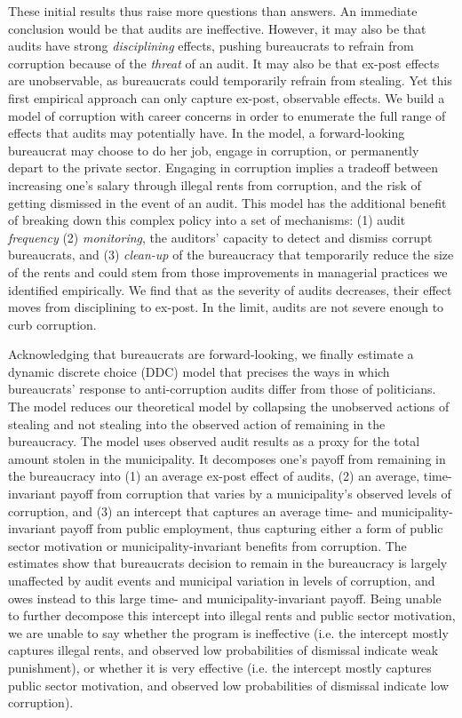 These initial results thus raise more questions than answers. An immediate conclusion would be that audits are ineffective. However, it may also be that audits have strong \emph{disciplining} effects, pushing bureaucrats to refrain from corruption because of the \emph{threat} of an audit. It may also be that ex-post effects are unobservable, as bureaucrats could temporarily refrain from stealing. Yet this first empirical approach can only capture ex-post, observable effects. We build a model of corruption with career concerns in order to enumerate the full range of effects that audits may potentially have. In the model, a forward-looking bureaucrat may choose to do her job, engage in corruption, or permanently depart to the private sector. Engaging in corruption implies a tradeoff between increasing one's salary through illegal rents from corruption, and the risk of getting dismissed in the event of an audit. This model has the additional benefit of breaking down this complex policy into a set of mechanisms: (1) audit \emph{frequency} (2) \emph{monitoring}, the auditors' capacity to detect and dismiss corrupt bureaucrats, and (3) \emph{clean-up} of the bureaucracy that temporarily reduce the size of the rents and could stem from those improvements in managerial practices we identified empirically. We find that as the severity of audits decreases, their effect moves from disciplining to ex-post. In the limit, audits are not severe enough to curb corruption.

Acknowledging that bureaucrats are forward-looking, we finally estimate a dynamic discrete choice (DDC) model that precises the ways in which bureaucrats' response to anti-corruption audits differ from those of politicians. The model reduces our theoretical model by collapsing the unobserved actions of stealing and not stealing into the observed action of remaining in the bureaucracy. The model uses observed audit results as a proxy for the total amount stolen in the municipality. It decomposes one's payoff from remaining in the bureaucracy into (1) an average ex-post effect of audits, (2) an average, time-invariant payoff from corruption that varies by a municipality's observed levels of corruption, and (3) an intercept that captures an average time- and municipality-invariant payoff from public employment, thus capturing either a form of public sector motivation \citep{dal2013strengthening} or municipality-invariant benefits from corruption. The estimates show that bureaucrats decision to remain in the bureaucracy is largely unaffected by audit events and municipal variation in levels of corruption, and owes instead to this large time- and municipality-invariant payoff. Being unable to further decompose this intercept into illegal rents and public sector motivation, we are unable to say whether the program is ineffective (i.e. the intercept mostly captures illegal rents, and observed low probabilities of dismissal indicate weak punishment), or whether it is very effective (i.e. the intercept mostly captures public sector motivation, and observed low probabilities of dismissal indicate low corruption). 

